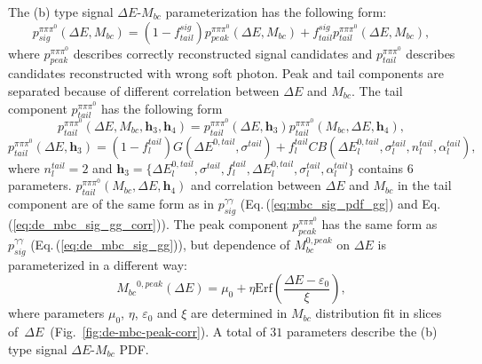 \documentclass[preprint,aps,showpacs]{revtex4}
\newcommand{\de}{\ensuremath{\Delta E}\xspace}
\newcommand{\mbc}{\ensuremath{M_{bc}}\xspace}
\begin{document}
The (b) type signal \de-\mbc parameterization has the following form:
\begin{equation}\label{eq:de_mbc_ppp_pdf}
 p_{sig}^{\pi\pi\pi^0}\left(\de,\mbc\right) = (1-f^{sig}_{tail})p^{\pi\pi\pi^0}_{peak}\left(\de,\mbc\right) + f^{sig}_{tail}p^{\pi\pi\pi^0}_{tail}\left(\de,\mbc\right),
\end{equation}
where $p^{\pi\pi\pi^0}_{peak}$ describes correctly reconstructed signal candidates and $p^{\pi\pi\pi^0}_{tail}$ describes candidates reconstructed with wrong soft photon. Peak and tail components are separated because of different correlation between \de and \mbc. The tail component $p^{\pi\pi\pi^0}_{tail}$ has the following form
\begin{equation}\label{eq:de_mbc_sig_ppp_tail}
 p^{\pi\pi\pi^0}_{tail}(\de,\mbc,\mathbf{h}_3,\mathbf{h}_4) = p^{\pi\pi\pi^0}_{tail}(\de,\mathbf{h}_3)p^{\pi\pi\pi^0}_{tail}(\mbc,\de,\mathbf{h}_4),
\end{equation}
\begin{equation}\label{eq:de_sig_pdf_ppp_tail}
 p^{\pi\pi\pi^0}_{tail}(\de,\mathbf{h}_3) = (1-f^{tail}_l)G(\de^{0,tail},\sigma^{tail})+f^{tail}_lCB(\de^{0,tail}_l,\sigma^{tail}_l,n^{tail}_l,\alpha^{tail}_l),
\end{equation}
where $n^{tail}_{l} = 2$ and $\mathbf{h}_3 = \{\de^{0,tail}_l,\sigma^{tail},f^{tail}_l,\de^{0,tail}_l,\sigma^{tail}_l,\alpha^{tail}_l\}$ contains $6$ parameters. $p^{\pi\pi\pi^0}_{tail}(\mbc,\de,\mathbf{h}_4)$ and 
 correlation between \de and \mbc in the tail component are of the same form as in $p_{sig}^{\gamma\gamma}$ (Eq.\,(\ref{eq:mbc_sig_pdf_gg}) and Eq.\,(\ref{eq:de_mbc_sig_gg_corr})).
 The peak component $p^{\pi\pi\pi^0}_{peak}$ has the same form as $p_{sig}^{\gamma\gamma}$ (Eq.\,(\ref{eq:de_mbc_sig_gg})), but dependence of $M_{bc}^{0,peak}$ on \de is parameterized in a different way:
\begin{equation}
 \mbc^{0,peak}(\de) = \mu_0 + \eta\text{Erf}\left(\frac{\de-\varepsilon_0}{\xi}\right),
\end{equation}
where parameters $\mu_0$, $\eta$, $\varepsilon_0$ and $\xi$ are determined in \mbc distribution fit in slices of~\de~(Fig.~\ref{fig:de-mbc-peak-corr}). A total of $31$ parameters describe the (b) type signal \de-\mbc PDF.
\end{document}
